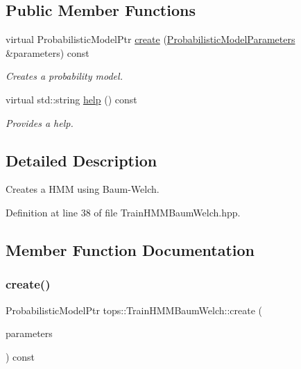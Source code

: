 \subsection*{Public Member Functions}
\begin{DoxyCompactItemize}
\item 
virtual Probabilistic\+Model\+Ptr \hyperlink{classtops_1_1TrainHMMBaumWelch_a8c7334a4a970afc9dac9d66c1001999a}{create} (\hyperlink{classtops_1_1ProbabilisticModelParameters}{Probabilistic\+Model\+Parameters} \&parameters) const
\begin{DoxyCompactList}\small\item\em Creates a probability model. \end{DoxyCompactList}\item 
\mbox{\label{classtops_1_1TrainHMMBaumWelch_a2cb37ecbba4eff238cd49a5c3449c315}} 
virtual std\+::string \hyperlink{classtops_1_1TrainHMMBaumWelch_a2cb37ecbba4eff238cd49a5c3449c315}{help} () const
\begin{DoxyCompactList}\small\item\em Provides a help. \end{DoxyCompactList}\end{DoxyCompactItemize}


\subsection{Detailed Description}
Creates a H\+MM using Baum-\/\+Welch. 

Definition at line 38 of file Train\+H\+M\+M\+Baum\+Welch.\+hpp.



\subsection{Member Function Documentation}
\mbox{\label{classtops_1_1TrainHMMBaumWelch_a8c7334a4a970afc9dac9d66c1001999a}} 
\subsubsection{\texorpdfstring{create()}{create()}}
{\footnotesize\ttfamily Probabilistic\+Model\+Ptr tops\+::\+Train\+H\+M\+M\+Baum\+Welch\+::create (\begin{DoxyParamCaption}\item[{\hyperlink{classtops_1_1ProbabilisticModelParameters}{Probabilistic\+Model\+Parameters} \&}]{parameters }\end{DoxyParamCaption}) const\hspace{0.3cm}{\ttfamily [virtual]}}



